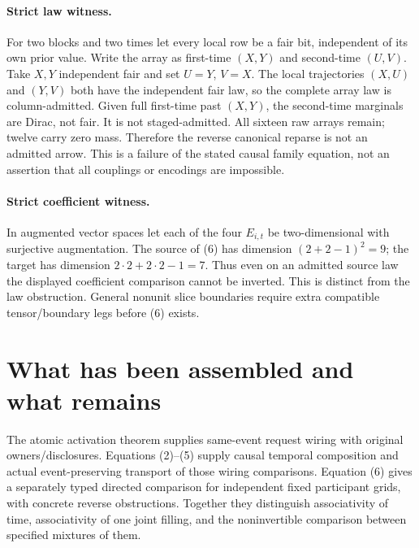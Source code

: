 \documentclass[11pt]{article}\usepackage{amsmath,amssymb,amsthm,geometry}\geometry{margin=1in}
\begin{document}
\paragraph{Strict law witness.} For two blocks and two times let every local row be a fair bit, independent of its own prior value. Write the array as first-time $(X,Y)$ and second-time $(U,V)$. Take $X,Y$ independent fair and set $U=Y$, $V=X$. The local trajectories $(X,U)$ and $(Y,V)$ both have the independent fair law, so the complete array law is column-admitted. Given full first-time past $(X,Y)$, the second-time marginals are Dirac, not fair. It is not staged-admitted. All sixteen raw arrays remain; twelve carry zero mass. Therefore the reverse canonical reparse is not an admitted arrow. This is a failure of the stated causal family equation, not an assertion that all couplings or encodings are impossible.

\paragraph{Strict coefficient witness.} In augmented vector spaces let each of the four $E_{i,t}$ be two-dimensional with surjective augmentation. The source of (6) has dimension $(2+2-1)^2=9$; the target has dimension $2\cdot2+2\cdot2-1=7$. Thus even on an admitted source law the displayed coefficient comparison cannot be inverted. This is distinct from the law obstruction. General nonunit slice boundaries require extra compatible tensor/boundary legs before (6) exists.

\section{What has been assembled and what remains}
The atomic activation theorem supplies same-event request wiring with original owners/disclosures. Equations (2)--(5) supply causal temporal composition and actual event-preserving transport of those wiring comparisons. Equation (6) gives a separately typed directed comparison for independent fixed participant grids, with concrete reverse obstructions. Together they distinguish associativity of time, associativity of one joint filling, and the noninvertible comparison between specified mixtures of them.
\end{document}
